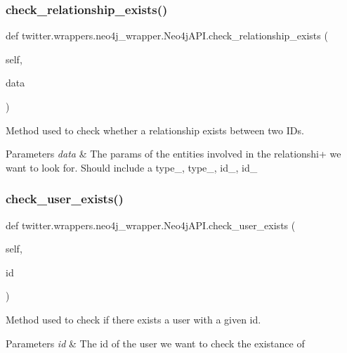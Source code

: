 \subsubsection{\texorpdfstring{check\+\_\+relationship\+\_\+exists()}{check\_relationship\_exists()}}
{\footnotesize\ttfamily def twitter.\+wrappers.\+neo4j\+\_\+wrapper.\+Neo4j\+A\+P\+I.\+check\+\_\+relationship\+\_\+exists (\begin{DoxyParamCaption}\item[{}]{self,  }\item[{}]{data }\end{DoxyParamCaption})}



Method used to check whether a relationship exists between two I\+Ds. 


\begin{DoxyParams}{Parameters}
{\em data} & The params of the entities involved in the relationshi+ we want to look for. Should include a type\+\_, type\+\_, id\+\_, id\+\_ \\
\hline
\end{DoxyParams}
\mbox{\label{classtwitter_1_1wrappers_1_1neo4j__wrapper_1_1Neo4jAPI_ab4ab706214e7d29521c47a40fe1e5b49}} 
\subsubsection{\texorpdfstring{check\+\_\+user\+\_\+exists()}{check\_user\_exists()}}
{\footnotesize\ttfamily def twitter.\+wrappers.\+neo4j\+\_\+wrapper.\+Neo4j\+A\+P\+I.\+check\+\_\+user\+\_\+exists (\begin{DoxyParamCaption}\item[{}]{self,  }\item[{}]{id }\end{DoxyParamCaption})}



Method used to check if there exists a user with a given id. 


\begin{DoxyParams}{Parameters}
{\em id} & The id of the user we want to check the existance of \\
\hline
\end{DoxyParams}
\mbox{\label{classtwitter_1_1wrappers_1_1neo4j__wrapper_1_1Neo4jAPI_a0995256fecdd24166fe3f8c0276a1124}} 
